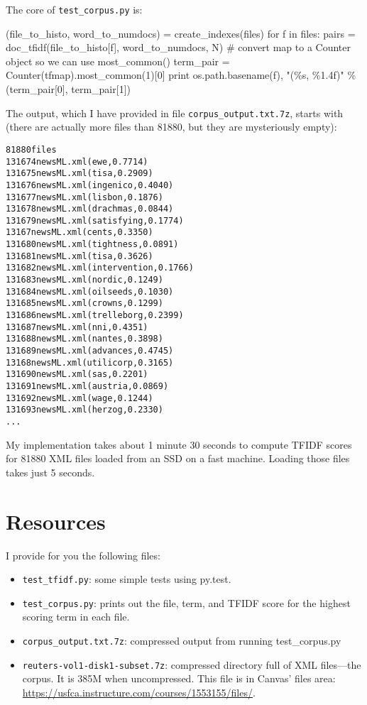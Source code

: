 \begin{fullwidth}
The core of {\tt test\_corpus.py} is:

\begin{pyverbatim}
(file_to_histo, word_to_numdocs) = create_indexes(files)
for f in files:
    pairs = doc_tfidf(file_to_histo[f], word_to_numdocs, N)
    # convert map to a Counter object so we can use most_common()
    term_pair = Counter(tfmap).most_common(1)[0]
    print os.path.basename(f), "(\%s, \%1.4f)" \% (term_pair[0], term_pair[1])
\end{pyverbatim}

\noindent The output, which I have provided in file {\tt corpus\_output.txt.7z}, starts with (there are actually more files than 81880, but they are mysteriously empty):

\begin{alltt}
81880 files
131674newsML.xml (ewe, 0.7714)
131675newsML.xml (tisa, 0.2909)
131676newsML.xml (ingenico, 0.4040)
131677newsML.xml (lisbon, 0.1876)
131678newsML.xml (drachmas, 0.0844)
131679newsML.xml (satisfying, 0.1774)
13167newsML.xml (cents, 0.3350)
131680newsML.xml (tightness, 0.0891)
131681newsML.xml (tisa, 0.3626)
131682newsML.xml (intervention, 0.1766)
131683newsML.xml (nordic, 0.1249)
131684newsML.xml (oilseeds, 0.1030)
131685newsML.xml (crowns, 0.1299)
131686newsML.xml (trelleborg, 0.2399)
131687newsML.xml (nni, 0.4351)
131688newsML.xml (nantes, 0.3898)
131689newsML.xml (advances, 0.4745)
13168newsML.xml (utilicorp, 0.3165)
131690newsML.xml (sas, 0.2201)
131691newsML.xml (austria, 0.0869)
131692newsML.xml (wage, 0.1244)
131693newsML.xml (herzog, 0.2330)
...
\end{alltt}

My implementation takes about 1 minute 30 seconds to compute TFIDF scores for 81880 XML files loaded from an SSD on a fast machine.  Loading those files takes just 5 seconds.
 
\section{Resources}

I provide for you the following files:

\begin{itemize}
\item {\tt test\_tfidf.py}: some simple tests using py.test.
\item {\tt test\_corpus.py}: prints out the file, term, and TFIDF score for the highest scoring term in each file.
\item {\tt corpus\_output.txt.7z}: compressed output from running test\_corpus.py
\item {\tt reuters-vol1-disk1-subset.7z}: compressed directory full of XML files---the corpus. It is 385M when uncompressed. This file is in Canvas' files area: \href{https://usfca.instructure.com/courses/1553155/files/}{https://usfca.instructure.com/courses/1553155/files/}.
\end{itemize}


\end{fullwidth}
